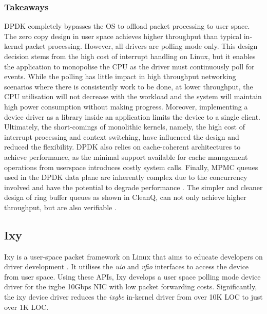 \subsubsection{Takeaways}
DPDK completely bypasses the OS to offload packet processing to user space. The zero copy design in user space
achieves higher throughput than typical in-kernel packet processing\cite{DPDK:wp_20}. However, all drivers 
are polling mode only. This design decision stems from the high cost of interrupt handling on Linux, but it enables
the application to monopolise the CPU as the driver must continuously poll for events. While the polling has little
impact in high throughput networking scenarios where there is consistently work to be done, at lower throughput,
the CPU utilisation will not decrease with the workload and the system will maintain high power consumption without
making progress. Moreover, implementing a device driver as a library inside an application limits the device to a
single client. Ultimately, the short-comings of monolithic kernels, namely, the high cost of interrupt processing
and context switching, have influenced the design and reduced the flexibility. DPDK also relies on cache-coherent
architectures to achieve performance, as the minimal support available for cache management operations from userspace
introduces costly system calls. Finally, MPMC queues used in the DPDK data plane are inherently complex due to the 
concurrency involved and have the potential to degrade performance \cite{Wang_BFOOLCHC_22}. The simpler and
cleaner design of ring buffer queues as shown in CleanQ, can not only achieve higher throughput, but are also
verifiable \cite{Haecki_HACSR_19}.

\subsection{Ixy}
Ixy is a user-space packet framework on Linux that aims to educate developers on driver development 
\cite{Emmerich_PBHZC_19}. It utilises the \emph{uio} and \emph{vfio} interfaces to access the device from
user space. Using these APIs, Ixy develops a user space polling mode device driver for the ixgbe 10Gbps
NIC with low packet forwarding costs. Significantly, the ixy device driver reduces the \emph{ixgbe}
in-kernel driver from over 10K LOC to just over 1K LOC.

